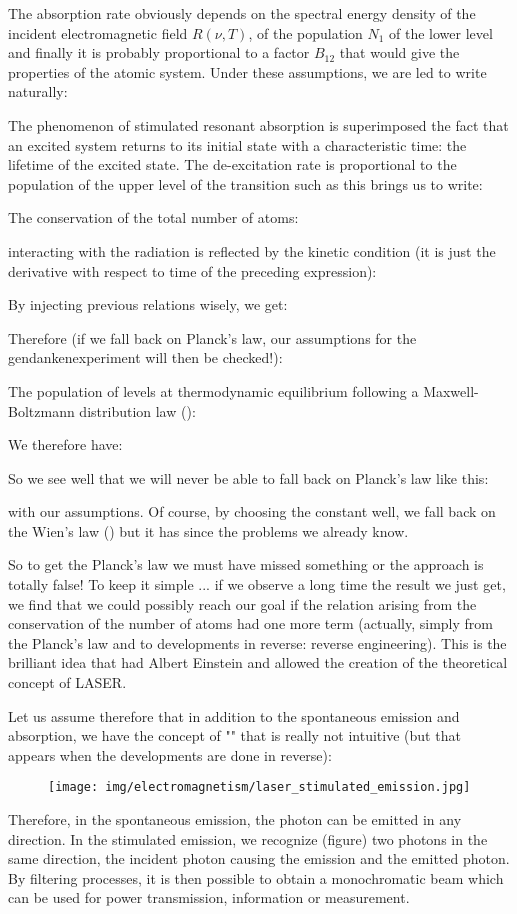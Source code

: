 	The absorption rate obviously depends on the spectral energy density of the incident electromagnetic field $R(\nu,T)$, of the population $N_1$ of the lower level and finally it is probably proportional to a factor $B_{12}$ that would give the properties of the atomic system. Under these assumptions, we are led to write naturally:
	
	The phenomenon of stimulated resonant absorption is superimposed the fact that an excited system returns to its initial state with a characteristic time: the lifetime of the excited state. The de-excitation rate is proportional to the population of the upper level of the transition such as this brings us to write:
	
	The conservation of the total number of atoms:
	
	interacting with the radiation is reflected by the kinetic condition (it is just the derivative with respect to time of the preceding expression):
	
	By injecting previous relations wisely, we get:
	
	Therefore (if we fall back on Planck's law, our assumptions for the gendankenexperiment will then be checked!):
	
	The population of levels at thermodynamic equilibrium following a Maxwell-Boltzmann distribution law ():
	
	We therefore have:
	
	So we see well that we will never be able to fall back on Planck's law like this:
	
	with our assumptions. Of course, by choosing the constant well, we fall back on the Wien's law () but it has since the problems we already know.

	So to get the Planck's law we must have missed something or the approach is totally false! To keep it simple ... if we observe a long time the result we just get, we find that we could possibly reach our goal if the relation arising from the conservation of the number of atoms had one more term (actually, simply from the Planck's law and to developments in reverse: reverse engineering). This is the brilliant idea that had Albert Einstein and allowed the creation of the theoretical concept of LASER.

	Let us assume therefore that in addition to the spontaneous  emission and absorption, we have the concept of "" that is really not intuitive (but that appears when the developments are done in reverse):
	\begin{figure}[H]
		\centering
		\texttt{[image: img/electromagnetism/laser\_stimulated\_emission.jpg]}
	\end{figure}
	Therefore, in the spontaneous emission, the photon can be emitted in any direction. In the stimulated emission, we recognize (figure) two photons in the same direction, the incident photon causing the emission and the emitted photon. By filtering processes, it is then possible to obtain a monochromatic beam which can be used for power transmission, information or measurement.

